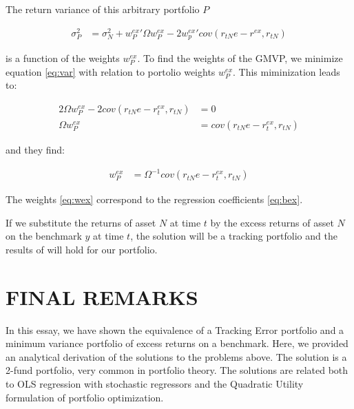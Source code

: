 \documentclass[12pt,oneside,a4paper]{memoir}
\begin{document}
The return variance of this arbitrary portfolio $P$

\vspace{-18 pt}
\begin{align}
	\label{eq:var}
\sigma^{2}_{P} &=
\sigma^{2}_{N} + w_{P}^{ex}' \Omega w_{P}^{ex} - 2w_{p}^{ex}' cov(r_{tN}e - r^{ex},r_{tN})
\end{align}

\noindent
is a function of the weights $w_{P}^{ex}$.
To find the weights of the GMVP, we minimize equation \eqref{eq:var} with relation to portolio weights $w_{P}^{ex}$.
This miminization leads to:

\vspace{-18 pt}
\begin{align*}
2 \Omega w_{P}^{ex} - 2 cov(r_{tN}e-r_{t}^{ex}, r_{tN}) &= 0 
\\
\Omega w_{P}^{ex} &= cov(r_{tN}e-r_{t}^{ex}, r_{tN})
\end{align*}

\noindent
and they find:

\vspace{-18 pt}
\begin{align}
	\label{eq:wex}
w_{P}^{ex} &= \Omega^{-1} cov(r_{tN}e-r_{t}^{ex}, r_{tN})
\end{align}

The weights \eqref{eq:wex} correspond to the regression coefficients \eqref{eq:bex}.

If we substitute the returns of asset $N$ at time $t$ by the excess returns of asset $N$ on the benchmark $y$ at time $t$, the solution will be a tracking portfolio and the results of  will hold for our portfolio.

\section{FINAL REMARKS}\label{section:conclusion}

In this essay, we have shown the equivalence of a Tracking Error portfolio and a minimum variance portfolio of excess returns on a benchmark.
Here, we provided an analytical derivation of the solutions to the problems above.
The solution is a 2-fund portfolio, very common in portfolio theory.
The solutions are related both to OLS regression with stochastic regressors and the Quadratic Utility formulation of portfolio optimization.
\end{document}
